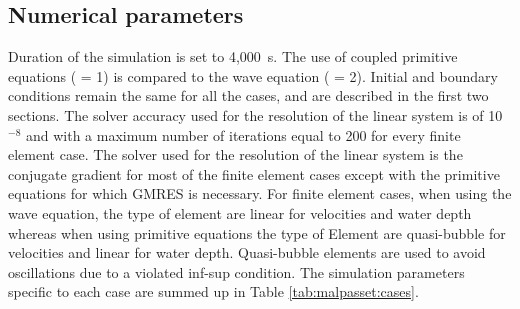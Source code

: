 \subsection{Numerical parameters}
\label{subsection:malpasset:cases}
Duration of the simulation is set to 4,000~s.
The use of coupled primitive equations
( = 1)
is compared to the wave equation ( = 2).
Initial and boundary conditions remain the same for all the cases, and are
described in the first two sections.
The solver accuracy used for the resolution of the linear system is
of 10$^{-8}$ and with a maximum number of iterations equal to 200 for every finite
element case.
The solver used for the resolution of the linear system is the conjugate gradient
for most of the finite element cases except with the primitive equations for which
GMRES is necessary.
For finite element cases, when using the wave equation, the type of element are
linear for velocities and water depth whereas when using primitive equations the
type of Element are quasi-bubble for velocities and linear for water depth.
Quasi-bubble elements are used to avoid oscillations due to a violated inf-sup
condition.
The simulation parameters specific to each case are summed up in Table
\ref{tab:malpasset:cases}.
\begin{table}[H]
  \caption{List of the simulation parameters used for the different cases tested.}
  \label{tab:malpasset:cases}
\end{table}

